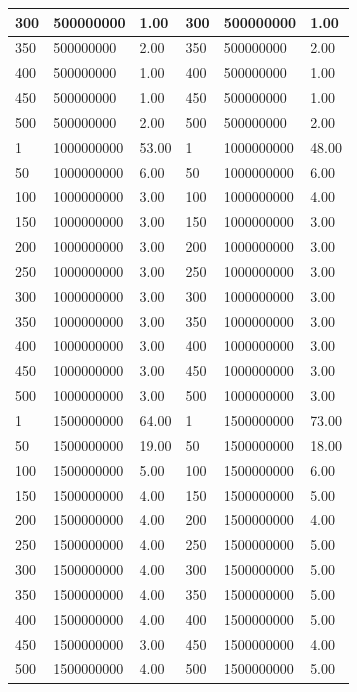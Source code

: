 \documentclass[letterpaper,10pt,titlepage]{article}
\begin{document}
\begin{enumerate}
\begin{tabular}{| l | l | l | l | l | l |}
\hline 300 & 500000000 & 1.00 & 300 & 500000000 & 1.00 \\
\hline 350 & 500000000 & 2.00 & 350 & 500000000 & 2.00 \\
\hline 400 & 500000000 & 1.00 & 400 & 500000000 & 1.00 \\
\hline 450 & 500000000 & 1.00 & 450 & 500000000 & 1.00 \\
\hline 500 & 500000000 & 2.00 & 500 & 500000000 & 2.00 \\
\hline 1 & 1000000000 & 53.00 & 1 & 1000000000 & 48.00 \\
\hline 50 & 1000000000 & 6.00 & 50 & 1000000000 & 6.00 \\
\hline 100 & 1000000000 & 3.00 & 100 & 1000000000 & 4.00 \\
\hline 150 & 1000000000 & 3.00 & 150 & 1000000000 & 3.00 \\
\hline 200 & 1000000000 & 3.00 & 200 & 1000000000 & 3.00 \\
\hline 250 & 1000000000 & 3.00 & 250 & 1000000000 & 3.00 \\
\hline 300 & 1000000000 & 3.00 & 300 & 1000000000 & 3.00 \\
\hline 350 & 1000000000 & 3.00 & 350 & 1000000000 & 3.00 \\
\hline 400 & 1000000000 & 3.00 & 400 & 1000000000 & 3.00 \\
\hline 450 & 1000000000 & 3.00 & 450 & 1000000000 & 3.00 \\
\hline 500 & 1000000000 & 3.00 & 500 & 1000000000 & 3.00 \\
\hline 1 & 1500000000 & 64.00 & 1 & 1500000000 & 73.00 \\
\hline 50 & 1500000000 & 19.00 & 50 & 1500000000 & 18.00 \\
\hline 100 & 1500000000 & 5.00 & 100 & 1500000000 & 6.00 \\
\hline 150 & 1500000000 & 4.00 & 150 & 1500000000 & 5.00 \\
\hline 200 & 1500000000 & 4.00 & 200 & 1500000000 & 4.00 \\
\hline 250 & 1500000000 & 4.00 & 250 & 1500000000 & 5.00 \\
\hline 300 & 1500000000 & 4.00 & 300 & 1500000000 & 5.00 \\
\hline 350 & 1500000000 & 4.00 & 350 & 1500000000 & 5.00 \\
\hline 400 & 1500000000 & 4.00 & 400 & 1500000000 & 5.00 \\
\hline 450 & 1500000000 & 3.00 & 450 & 1500000000 & 4.00 \\
\hline 500 & 1500000000 & 4.00 & 500 & 1500000000 & 5.00 \\

\end{tabular}
\end{enumerate}
\end{document}
